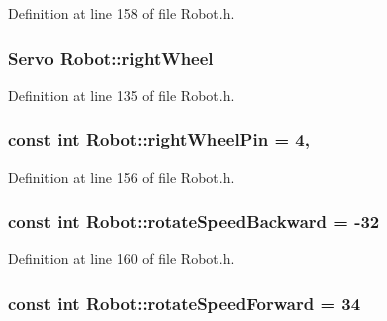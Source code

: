 Definition at line 158 of file Robot.\-h.

\hypertarget{classRobot_a3b2dd5b89e44fd3a7ba239554fb5b8a7}{
\subsubsection[{right\-Wheel}]{\setlength{\rightskip}{0pt plus 5cm}Servo Robot\-::right\-Wheel\hspace{0.3cm}{\ttfamily [private]}}}\label{classRobot_a3b2dd5b89e44fd3a7ba239554fb5b8a7}


Definition at line 135 of file Robot.\-h.

\hypertarget{classRobot_a572525b971da4e0f272f5f1259f6c84f}{
\subsubsection[{right\-Wheel\-Pin}]{\setlength{\rightskip}{0pt plus 5cm}const int Robot\-::right\-Wheel\-Pin = 4\hspace{0.3cm}{\ttfamily [static]}, {\ttfamily [private]}}}\label{classRobot_a572525b971da4e0f272f5f1259f6c84f}


Definition at line 156 of file Robot.\-h.

\hypertarget{classRobot_a04bc29522467c056ae6698017f32f048}{
\subsubsection[{rotate\-Speed\-Backward}]{\setlength{\rightskip}{0pt plus 5cm}const int Robot\-::rotate\-Speed\-Backward = -\/32\hspace{0.3cm}{\ttfamily [private]}}}\label{classRobot_a04bc29522467c056ae6698017f32f048}


Definition at line 160 of file Robot.\-h.

\hypertarget{classRobot_a9cf41f47520ed8f848da5c6e2d0ff7b0}{
\subsubsection[{rotate\-Speed\-Forward}]{\setlength{\rightskip}{0pt plus 5cm}const int Robot\-::rotate\-Speed\-Forward = 34\hspace{0.3cm}{\ttfamily [private]}}}\label{classRobot_a9cf41f47520ed8f848da5c6e2d0ff7b0}


